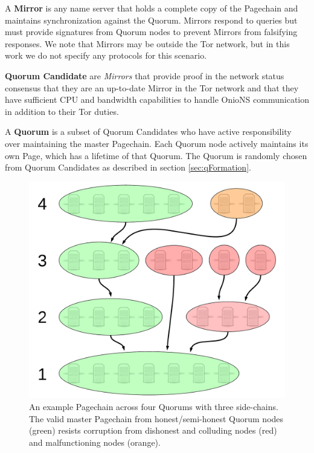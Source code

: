 \documentclass[conference]{IEEEtran}
\begin{document}
A \textbf{Mirror} is any name server that holds a complete copy of the Pagechain and maintains synchronization against the Quorum. Mirrors respond to queries but must provide signatures from Quorum nodes to prevent Mirrors from falsifying responses. We note that Mirrors may be outside the Tor network, but in this work we do not specify any protocols for this scenario.

\textbf{Quorum Candidate} are \emph{Mirrors} that provide proof in the network status consensus that they are an up-to-date Mirror in the Tor network and that they have sufficient CPU and bandwidth capabilities to handle OnioNS communication in addition to their Tor duties.

A \textbf{Quorum} is a subset of Quorum Candidates who have active responsibility over maintaining the master Pagechain. Each Quorum node actively maintains its own Page, which has a lifetime of that Quorum. The Quorum is randomly chosen from Quorum Candidates as described in section \ref{sec:qFormation}.

\begin{figure}[h]
	\centering
	\includegraphics[width=0.7\linewidth]{../assets/images/LucidCharts/Page-chain2.pdf}
	\caption{An example Pagechain across four Quorums with three side-chains. The valid master Pagechain from honest/semi-honest Quorum nodes (green) resists corruption from dishonest and colluding nodes (red) and malfunctioning nodes (orange).}
	\label{fig:sideChains}
\end{figure}
\end{document}
